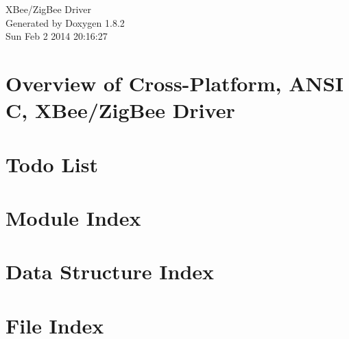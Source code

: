 \documentclass{book}
\begin{document}
\hypersetup{pageanchor=false,citecolor=blue}
\begin{titlepage}
\vspace*{7cm}
\begin{center}
{\Large X\-Bee/\-Zig\-Bee Driver }\\
\vspace*{1cm}
{\large Generated by Doxygen 1.8.2}\\
\vspace*{0.5cm}
{\small Sun Feb 2 2014 20:16:27}\\
\end{center}
\end{titlepage}
\clearemptydoublepage
{}
\tableofcontents
\clearemptydoublepage
{}
\hypersetup{pageanchor=true,citecolor=blue}
\chapter{Overview of Cross-\/\-Platform, A\-N\-S\-I C, X\-Bee/\-Zig\-Bee Driver}
\label{index}\hypertarget{index}{}
\chapter{Todo List}
\label{todo}
\hypertarget{todo}{}

\chapter{Module Index}

\chapter{Data Structure Index}

\chapter{File Index}

\end{document}
